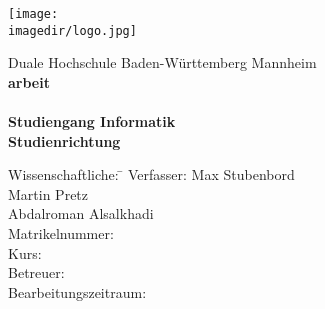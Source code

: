 \begin{titlepage}
	\begin{minipage}{\textwidth}
		\vspace{-2cm}
 \texttt{[image: \\imagedir/logo.jpg]}
	\end{minipage}
	\vspace{1em}
	\begin{center}
		{\textsf{\large Duale Hochschule Baden-W\"urttemberg Mannheim}}\\[4em]
		{\textsf{\textbf{\large{\DieArtDerArbeit}arbeit}}}\\[6mm]
		{\textsf{\textbf{\Large{}\DerTitelDerArbeit}}} \\[1.5cm]
		{\textsf{\textbf{\large{}Studiengang Informatik}}\\[6mm]
		\textsf{\textbf{Studienrichtung \DieStudienrichtung}}}\vspace{10em}

		\begin{minipage}{\textwidth}
			\begin{tabbing}
				Wissenschaftliche: \hspace{0.85cm}\=\kill
				Verfasser: \> Max Stubenbord \\ \>  Martin Pretz \\ \> Abdalroman Alsalkhadi\\[1.5mm]
				Matrikelnummer: \> \DieMatrikelnummer \\[1.5mm]
				Kurs: \> \DieKursbezeichnung \\[1.5mm]
				Betreuer: \> \DerStudiengangsleiter \\[1.5mm]
				Bearbeitungszeitraum: \> \DerBearbeitungszeitraum\\[1.5mm]
			\end{tabbing}
		\end{minipage}
	\end{center}
\end{titlepage}